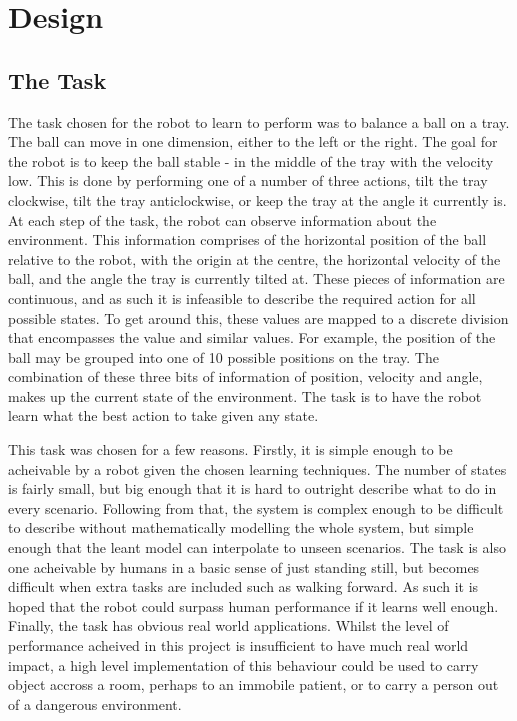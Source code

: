 \documentclass[12pt,a4paper]{article}
\begin{document}
\section{Design}

\subsection{The Task}
The task chosen for the robot to learn to perform was to balance a ball on a tray. The ball can move in one dimension, either to the left or the right. The goal for the robot is to keep the ball stable - in the middle of the tray with the velocity low. This is done by performing one of a number of three actions, tilt the tray clockwise, tilt the tray anticlockwise, or keep the tray at the angle it currently is. At each step of the task, the robot can observe information about the environment. This information comprises of the horizontal position of the ball relative to the robot, with the origin at the centre, the horizontal velocity of the ball, and the angle the tray is currently tilted at. These pieces of information are continuous, and as such it is infeasible to describe the required action for all possible states. To get around this, these values are mapped to a discrete division that encompasses the value and similar values. For example, the position of the ball may be grouped into one of 10 possible positions on the tray. The combination of these three bits of information of position, velocity and angle, makes up the current state of the environment. The task is to have the robot learn what the best action to take given any state.

This task was chosen for a few reasons. Firstly, it is simple enough to be acheivable by a robot given the chosen learning techniques. The number of states is fairly small, but big enough that it is hard to outright describe what to do in every scenario. Following from that, the system is complex enough to be difficult to describe without mathematically modelling the whole system, but simple enough that the leant model can interpolate to unseen scenarios. The task is also one acheivable by humans in a basic sense of just standing still, but becomes difficult when extra tasks are included such as walking forward. As such it is hoped that the robot could surpass human performance if it learns well enough. Finally, the task has obvious real world applications. Whilst the level of performance acheived in this project is insufficient to have much real world impact, a high level implementation of this behaviour could be used to carry object accross a room, perhaps to an immobile patient, or to carry a person out of a dangerous environment.
\end{document}
